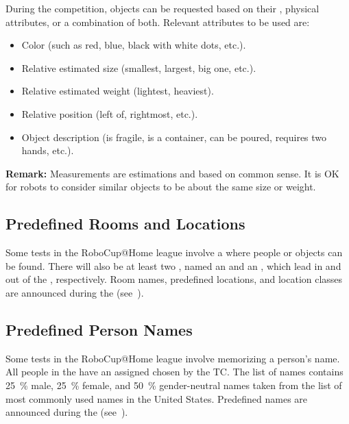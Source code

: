 During the competition, objects can be requested based on their \ObjectCategory{}, physical attributes, or a combination of both.
Relevant attributes to be used are:
\begin{itemize}
	\item Color (such as red, blue, black with white dots, etc.).
	\item Relative estimated size (smallest, largest, big one, etc.).
	\item Relative estimated weight (lightest, heaviest).
	\item Relative position (left of, rightmost, etc.).
	\item Object description (is fragile, is a container, can be poured, requires two hands, etc.).
\end{itemize}

\noindent\textbf{Remark:} Measurements are estimations and based on common sense. It is OK for robots to consider similar objects to be about the same size or weight.

%
%

\subsection{Predefined Rooms and Locations}\label{rule:scenario_locations}

Some tests in the RoboCup@Home league involve a \PredefinedLocation{} where people or objects can be found.
There will also be at least two , named an \Entrance{} and an \Exit, which lead in and out of the \Arena{}, respectively.
Room names, predefined locations, and location classes are announced during the \SetupDays{} (see~).

\subsection{Predefined Person Names}\label{rule:scenario_names}

Some tests in the RoboCup@Home league involve memorizing a person's name.
All people in the \Arena{} have an assigned \PredefinedName{} chosen by the TC.
The list of names contains \SI{25}{\percent} male, \SI{25}{\percent} female, and \SI{50}{\percent} gender-neutral names taken from the list of most commonly used names in the United States.
Predefined names are announced during the \SetupDays{} (see~).

